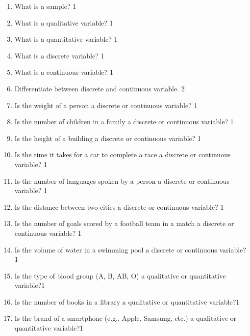 \documentclass[a4paper,oneside]{book}
\begin{document}
\begin{enumerate}
\item What is a sample? \hfill 1

\item What is a qualitative variable? \hfill 1

\item What is a quantitative variable? \hfill 1

\item What is a discrete variable? \hfill 1

\item What is a continuous variable? \hfill 1

\item Differentiate between discrete and continuous variable. \hfill 2
\item Is the weight of a person a discrete or continuous variable? \hfill 1

\item Is the number of children in a family a discrete or continuous variable? \hfill 1

\item Is the height of a building a discrete or continuous variable? \hfill 1

\item Is the time it takes for a car to complete a race a discrete or continuous variable? \hfill 1

\item Is the number of languages spoken by a person a discrete or continuous variable? \hfill 1

\item Is the distance between two cities a discrete or continuous variable? \hfill 1


\item Is the number of goals scored by a football team in a match a discrete 
or continuous variable? \hfill 1

\item Is the volume of water in a swimming pool a discrete or continuous 
variable? \hfill 1

\item Is the type of blood group (A, B, AB, O) a qualitative or 
quantitative variable?\hfill 1

\item Is the number of books in a library a qualitative or quantitative 
variable?\hfill 1

\item Is the brand of a smartphone (e.g., Apple, Samsung, etc.) 
a qualitative or quantitative variable?\hfill 1


\end{enumerate}
\end{document}
